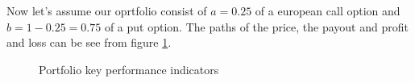 \documentclass[a4paper, 12pt]{article}
\theoremstyle{definition}
\theoremstyle{plain}
\theoremstyle{definition}
\begin{document}
 \newpage
Now let's assume our oprtfolio consist of $a = 0.25$ 
of a european call option and $b = 1- 0.25 = 0.75$ of 
a put option. 
The paths of the price, the payout and profit and loss 
can be see from figure \ref{fig:kpi}.

\begin{figure}[ht!]
    \centering
    \caption{Portfolio key performance indicators}
 \label{fig:kpi}
 \end{figure}
\end{document}
